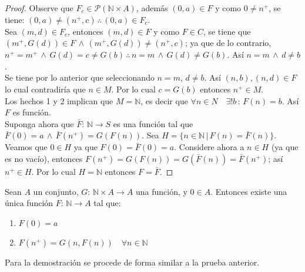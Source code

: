 \begin{proof}
        Observe que $F_c \in \mathcal{P}(\mathbb{N} \times A)$, además
        $(0,a)\in F$ y como $0 \neq n^+$, se tiene: $(0,a) \neq (n^+, c) \,
        \therefore \, (0,a) \in F_c$. \\
        Sea $(m, d)\in F_c$, entonces $(m,d)\in F$ y como $F \in C$, se tiene
        que $(m^+, G(d))\in F \, \land \, (m^+, G(d)) \neq (n^+, c)$; ya que de
        lo contrario, $n^+ = m^+ \, \land \, G(d) =  c \neq G(b) \, \therefore
        \, n=m \, \land \, G(d) \neq G(b)$. Así $n=m \, \land \, d\neq b$. \\
        Se tiene por lo anterior que seleccionando $n=m$, $d \neq b$. Así
        $(n,b), (n,d) \in F$ lo cual contradiría que $n \in M$. Por lo cual
        $c=G(b)$ entonces $n^+ \in M$. \\
        Los hechos 1 y 2 implican que $M=\mathbb{N}$, es decir que $\forall n
        \in N \quad \exists !b\, : \,  F(n) = b$. Así $F$ es función. \\
        Suponga ahora que $\bar{F}: \, \mathbb{N} \rightarrow S$ es una función
        tal que $\bar{F}(0) =a \, \land \, \bar{F}(n^+)=G(F(n))$. Sea $H=\{n\in
        \mathbb{N} \, | \, F(n) = \bar{F}(n) \}$. Veamos que $0 \in H$ ya que
        $F(0)=\bar{F}(0) = a$. Considere ahora a $n \in H$ (ya que es no vacío),
        entonces $F(n^+)=G(F(n))=G(\bar{F}(n))=\bar{F}(n^+)$; así $n^+ \in H$.
        Por lo cual $H = \mathbb{N}$ entonces $F=\bar{F}$.
    \end{proof}
    \begin{proposition}\label{pr:recurrencia2} Sean $A$ un conjunto, $G:\, \mathbb{N}\times A \rightarrow
        A$ una función, y $0 \in A$. Entonces existe una única función $F: \,
        \mathbb{N} \rightarrow A$ tal que:
        \begin{enumerate}
            \item $F(0) = a$
            \item $F(n^+)=G(n,F(n)) \quad \forall n \in \mathbb{N}$
        \end{enumerate}
    \end{proposition}
    Para la demostración se procede de forma similar a la prueba anterior.
